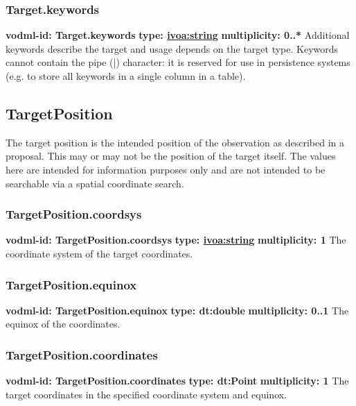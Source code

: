     \subsubsection{Target.keywords}
      \textbf{vodml-id: Target.keywords} \newline
      \textbf{type: \hyperref[sect:ivoa]{ivoa:string}} \newline
      \textbf{multiplicity: 0..*} \newline
      Additional keywords describe the target and usage depends on the target type. Keywords cannot contain the pipe (|) character: it is reserved for use in persistence systems (e.g. to store all keywords in a single column in a table).

  \subsection{TargetPosition}
  \label{sect:TargetPosition}
    The target position is the intended position of the observation as described in a proposal. This may or may not be the position of the target itself. The values here are intended for information purposes only and are not intended to be searchable via a spatial coordinate search.

    \subsubsection{TargetPosition.coordsys}
      \textbf{vodml-id: TargetPosition.coordsys} \newline
      \textbf{type: \hyperref[sect:ivoa]{ivoa:string}} \newline
      \textbf{multiplicity: 1} \newline
      The coordinate system of the target coordinates.

    \subsubsection{TargetPosition.equinox}
      \textbf{vodml-id: TargetPosition.equinox} \newline
      \textbf{type: dt:double} \newline
      \textbf{multiplicity: 0..1} \newline
      The equinox of the coordinates.

    \subsubsection{TargetPosition.coordinates}
      \textbf{vodml-id: TargetPosition.coordinates} \newline
      \textbf{type: dt:Point} \newline
      \textbf{multiplicity: 1} \newline
      The target coordinates in the specified coordinate system and equinox.

